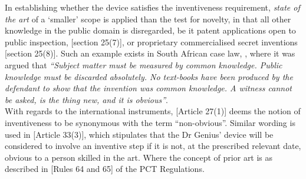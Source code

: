 \documentclass[11pt]{article}
\begin{document}
In establishing whether the device satisfies the inventiveness requirement, \emph{state of the art} of a `smaller' scope is applied than the test for novelty, in that all other knowledge in the public domain is disregarded, be it patent applications open to public inspection, [section 25(7)]\cite{rsa78_patents_act}, or proprietary commercialised secret inventions [section 25(8)]\cite{rsa78_patents_act}. Such an example exists in South African case law,  \cite{davis42_levin_v_numplates}, where it was argued that \emph{``Subject matter must be measured by common knowledge. Public knowledge must be discarded absolutely. No text-books have been produced by the defendant to show that the invention was common knowledge. A witness cannot be asked, is the thing new, and it is obvious''}.\\

With regards to the international instruments, [Article 27(1)]\cite{wto17_trips}
deems the notion of inventiveness to be synonymous with the term
``non-obvious''. Similar wording is used in [Article 33(3)]\cite{wipo70_pct},
which stipulates that the Dr Genius' device will be considered to involve an
inventive step if it is not, at the prescribed relevant date, obvious to a
person skilled in the art. Where the concept of prior art is as described in
[Rules 64 and 65]\cite{wipo70_pct_reg} of the PCT Regulations.
\printbibliography
\end{document}
